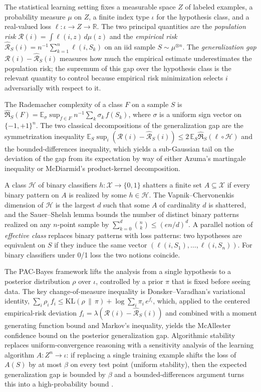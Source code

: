 \documentclass[sigplan,anonymous,review,screen]{acmart}
\newcommand{\Risk}{\mathcal{R}}
\newcommand{\eRisk}{\widehat{\mathcal{R}}}
\newcommand{\Rad}{\widehat{\mathfrak{R}}}
\newcommand{\KL}{\mathrm{KL}}
\newcommand{\E}{\mathbb{E}}
\newcommand{\R}{\mathbb{R}}
\newcommand{\Hyp}{\mathcal{H}}
\begin{document}
The statistical learning setting fixes a measurable space $Z$ of
labeled examples, a probability measure $\mu$ on $Z$, a finite index
type $\iota$ for the hypothesis class, and a real-valued loss
$\ell : \iota \to Z \to \R$. The two principal quantities are the
\emph{population risk} $\Risk(i) = \int \ell(i, z)\,d\mu(z)$ and the
\emph{empirical risk}
$\eRisk_S(i) = n^{-1} \sum_{k=1}^{n} \ell(i, S_k)$ on an iid sample
$S \sim \mu^{\otimes n}$. The \emph{generalization gap}
$\Risk(i) - \eRisk_S(i)$ measures how much the empirical estimate
underestimates the population risk; the supremum of this gap over the
hypothesis class is the relevant quantity to control because empirical
risk minimization selects $i$ adversarially with respect to it.

The Rademacher complexity of a class $F$ on a sample $S$ is
$\Rad_S(F) = \E_\sigma \sup_{f \in F} n^{-1} \sum_k \sigma_k\, f(S_k)$,
where $\sigma$ is a uniform sign vector on $\{-1, +1\}^n$. The two
classical decompositions of the generalization gap are the
symmetrization inequality
$\E_S \sup_i (\Risk(i) - \eRisk_S(i)) \le 2\, \E_S \Rad_S(\ell \circ \Hyp)$
and the bounded-differences inequality, which yields a sub-Gaussian tail
on the deviation of the gap from its expectation by way of either
Azuma's martingale inequality or McDiarmid's product-kernel
decomposition.

A class $\Hyp$ of binary classifiers $h : \mathcal{X} \to \{0, 1\}$
shatters a finite set $A \subseteq \mathcal{X}$ if every binary pattern
on $A$ is realized by some $h \in \Hyp$. The
Vapnik--Chervonenkis dimension of $\Hyp$ is the largest $d$ such that
some $A$ of cardinality $d$ is shattered, and the Sauer--Shelah lemma
bounds the number of distinct binary patterns realized on any
$n$-point sample by $\sum_{k=0}^{d} \binom{n}{k} \le (en/d)^d$. A
parallel notion of \emph{effective class} replaces binary patterns with
loss patterns: two hypotheses are equivalent on $S$ if they induce the
same vector $(\ell(i, S_1), \ldots, \ell(i, S_n))$. For binary
classifiers under 0/1 loss the two notions coincide.

The PAC-Bayes framework lifts the analysis from a single hypothesis to
a posterior distribution $\rho$ over $\iota$, controlled by a prior
$\pi$ that is fixed before seeing data. The key change-of-measure
inequality is Donsker--Varadhan's variational identity,
$\sum_i \rho_i\, f_i \le \KL(\rho \,\|\, \pi)
                       + \log \sum_i \pi_i\, e^{f_i}$,
which, applied to the centered empirical-risk deviation
$f_i = \lambda(\Risk(i) - \eRisk_S(i))$ and combined with a moment
generating function bound and Markov's inequality, yields the
McAllester confidence bound on the posterior generalization gap.
Algorithmic stability replaces uniform-convergence reasoning with a
sensitivity analysis of the learning algorithm $A : Z^n \to \iota$:
if replacing a single training example shifts the loss of $A(S)$ by at
most $\beta$ on every test point (uniform stability), then the
expected generalization gap is bounded by $\beta$ and a
bounded-differences argument turns this into a high-probability
bound \cite{BousquetElisseeff2002}.
\end{document}
